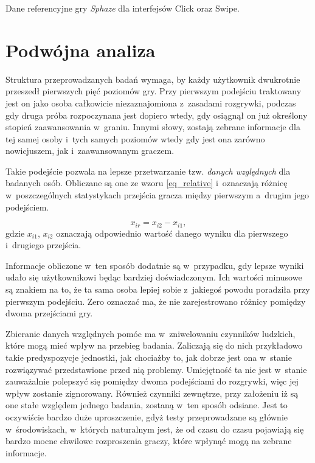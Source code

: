 \documentclass[a4paper,12pt,numbers=noenddot]{report}
\begin{document}
\begin{table}[H]
  \centering
  
  \caption{Dane referencyjne gry \textit{Sphaze} dla interfejsów Click oraz Swipe.}
	
  \label{tab:ref_data}%
\end{table}%

\section{Podwójna analiza}
Struktura przeprowadzanych badań wymaga, by każdy użytkownik dwukrotnie przeszedł pierwszych pięć poziomów gry. Przy pierwszym podejściu traktowany jest on jako osoba całkowicie niezaznajomiona z~zasadami rozgrywki, podczas gdy druga próba rozpoczynana jest dopiero wtedy, gdy osiągnął on już określony stopień zaawansowania w~graniu. Innymi słowy, zostają zebrane informacje dla tej samej osoby i~tych samych poziomów wtedy gdy jest ona zarówno nowicjuszem, jak i~zaawansowanym graczem. 

Takie podejście pozwala na lepsze przetwarzanie tzw. \textit{danych względnych} dla badanych osób. Obliczane są one ze wzoru \ref{eq_relative} i~oznaczają różnicę w~poszczególnych statystykach przejścia gracza między pierwszym a~drugim jego podejściem. 

\begin{equation}
\label{eq_relative}
x_{ir} = x_{i2} - x_{i1},
\end{equation}
gdzie $x_{i1}$, $x_{i2}$ oznaczają odpowiednio wartość danego wyniku dla pierwszego i~drugiego przejścia.

Informacje obliczone w~ten sposób dodatnie są w~przypadku, gdy lepsze wyniki udało się użytkownikowi będąc bardziej doświadczonym. Ich wartości minusowe są znakiem na to, że ta sama osoba lepiej sobie z~jakiegoś powodu poradziła przy pierwszym podejściu. Zero oznaczać ma, że nie zarejestrowano różnicy pomiędzy dwoma przejściami gry.

Zbieranie danych względnych pomóc ma w~zniwelowaniu czynników ludzkich, które mogą mieć wpływ na przebieg badania. Zaliczają się do nich przykładowo takie predyspozycje jednostki, jak chociażby to, jak dobrze jest ona w~stanie rozwiązywać przedstawione przed nią problemy. Umiejętność ta nie jest w~stanie zauważalnie polepszyć się pomiędzy dwoma podejściami do rozgrywki, więc jej wpływ zostanie zignorowany.
Również czynniki zewnętrze, przy założeniu iż są one stałe względem jednego badania, zostaną w~ten sposób odsiane. Jest to oczywiście bardzo duże uproszczenie, gdyż testy przeprowadzane są głównie w~środowiskach, w~których naturalnym jest, że od czasu do czasu pojawiają się bardzo mocne chwilowe rozproszenia graczy, które wpłynąć mogą na zebrane informacje.
\end{document}
